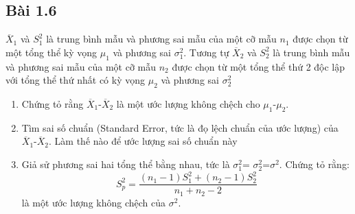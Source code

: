 \subsection{Bài 1.6}

\begin{problem}{1.6}
$\overline{X}_1$ và $S^2_1$ là trung bình mẫu và phương sai mẫu của một cỡ mẫu $n_1$ được chọn từ một tổng thể kỳ vọng $\mu_1$ và phương sai $\sigma_1^2$. Tương tự $\overline{X}_2$ và $S^2_2$ là trung bình mẫu và phương sai mẫu của một cỡ mẫu $n_2$ được chọn từ một tổng thể thứ 2 độc lập với tổng thể thứ nhất có kỳ vọng $\mu_2$ và phương sai $\sigma_2^2$
\begin{enumerate}[label=(\alph*)]
\item Chứng tỏ rằng $\overline{X}_1$-$\overline{X}_2$ là một ước lượng không chệch cho $\mu_1$-$\mu_2$.
\item Tìm sai số chuẩn (Standard Error, tức là đọ lệch chuẩn của ước lượng) của $\overline{X}_1$-$\overline{X}_2$. Làm thế nào để ước lượng sai số chuẩn này
\item Giả sử phương sai hai tổng thể bằng nhau, tức là $\sigma_1^2$= $\sigma_2^2$=$\sigma^2$. Chứng tỏ rằng:
\[ S^2_p = \dfrac{(n_1-1)S^2_1+(n_2-1)S^2_2}{n_1+n_2-2}\]
là một ước lượng không chệch của  $\sigma^2$.
\end{enumerate}
\end{problem}

